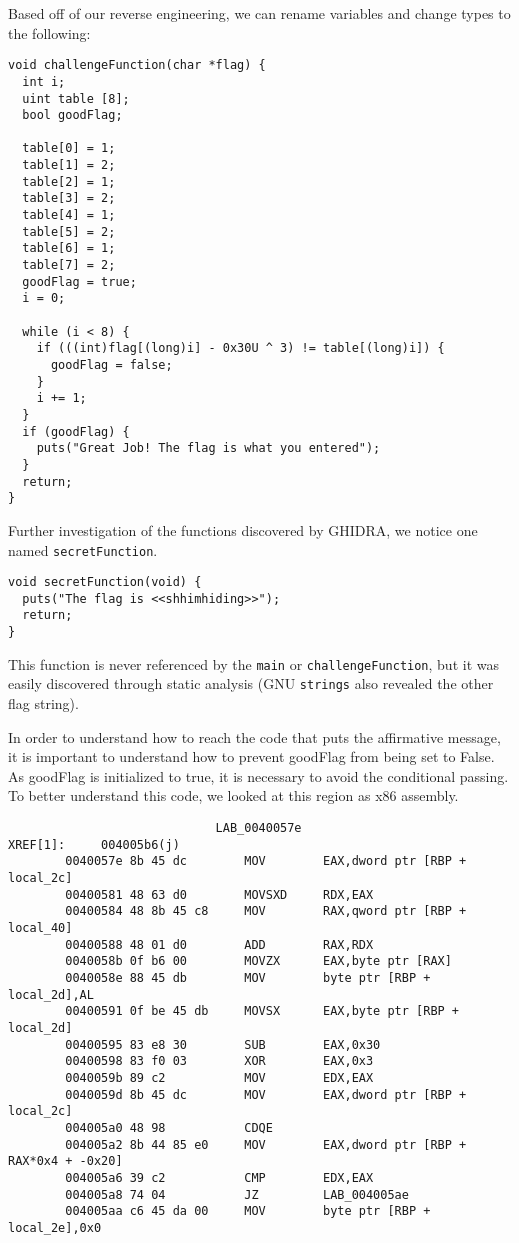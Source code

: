 Based off of our reverse engineering, we can rename variables and change types to the following:
\begin{lstlisting}
void challengeFunction(char *flag) {
  int i;
  uint table [8];
  bool goodFlag;
  
  table[0] = 1;
  table[1] = 2;
  table[2] = 1;
  table[3] = 2;
  table[4] = 1;
  table[5] = 2;
  table[6] = 1;
  table[7] = 2;
  goodFlag = true;
  i = 0;

  while (i < 8) {
    if (((int)flag[(long)i] - 0x30U ^ 3) != table[(long)i]) {
      goodFlag = false;
    }
    i += 1;
  }
  if (goodFlag) {
    puts("Great Job! The flag is what you entered");
  }
  return;
}
\end{lstlisting}

Further investigation of the functions discovered by GHIDRA, we notice one named \texttt{secretFunction}.

\begin{lstlisting}
void secretFunction(void) {
  puts("The flag is <<shhimhiding>>");
  return;
}
\end{lstlisting}

This function is never referenced by the \texttt{main} or \texttt{challengeFunction}, but it was easily discovered through static analysis (GNU \texttt{strings} also revealed the other flag string).

In order to understand how to reach the code that puts the affirmative message, it is important to understand how to prevent goodFlag from being set to False. As goodFlag is initialized to true, it is necessary to avoid the conditional passing. To better understand this code, we looked at this region as x86 assembly.

\begin{lstlisting}
                             LAB_0040057e                                    XREF[1]:     004005b6(j)  
        0040057e 8b 45 dc        MOV        EAX,dword ptr [RBP + local_2c]
        00400581 48 63 d0        MOVSXD     RDX,EAX
        00400584 48 8b 45 c8     MOV        RAX,qword ptr [RBP + local_40]
        00400588 48 01 d0        ADD        RAX,RDX
        0040058b 0f b6 00        MOVZX      EAX,byte ptr [RAX]
        0040058e 88 45 db        MOV        byte ptr [RBP + local_2d],AL
        00400591 0f be 45 db     MOVSX      EAX,byte ptr [RBP + local_2d]
        00400595 83 e8 30        SUB        EAX,0x30
        00400598 83 f0 03        XOR        EAX,0x3
        0040059b 89 c2           MOV        EDX,EAX
        0040059d 8b 45 dc        MOV        EAX,dword ptr [RBP + local_2c]
        004005a0 48 98           CDQE
        004005a2 8b 44 85 e0     MOV        EAX,dword ptr [RBP + RAX*0x4 + -0x20]
        004005a6 39 c2           CMP        EDX,EAX
        004005a8 74 04           JZ         LAB_004005ae
        004005aa c6 45 da 00     MOV        byte ptr [RBP + local_2e],0x0
\end{lstlisting}

